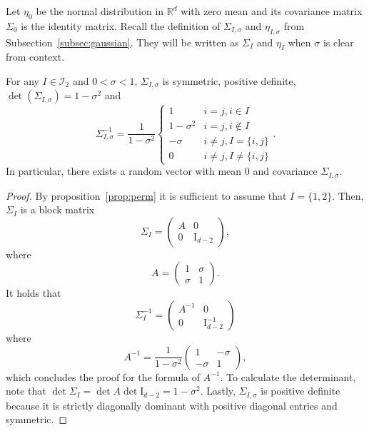 \documentclass[final, 12pt]{colt2018}
\newcommand{\subsecref}[1]{Subsection~\ref{#1}}
\begin{document}
Let $\eta_0$ be the normal distribution in $\mathbb{R}^d$ with zero mean and its covariance matrix $\Sigma_0$ is the identity matrix. Recall the definition of $\Sigma_{I,\sigma}$ and $\eta_{I,\sigma}$ from \subsecref{subsec:gaussian}. They will be written as $\Sigma_I$ and $\eta_I$  when $\sigma$ is clear from context.

\begin{lemma} \label{lem:sigma-I}
For any $I \in \mathcal{I}_2$ and $0 < \sigma < 1$, $\Sigma_{I,\sigma}$ is symmetric, positive definite, $\det(\Sigma_{I,\sigma}) = 1 - \sigma^2$ and 
\begin{equation} \label{eq:def-sig-inv}
\Sigma_{I,\sigma}^{-1}
= \frac{1}{1-\sigma^2} \begin{cases}
1 & i=j, i \in I \\
1 - \sigma^2 & i = j, i \notin I \\
-\sigma & i \ne j, I = \{i,j\} \\
0 & i \ne j, I \ne \{i,j\}
\end{cases}.
\end{equation}
In particular, there exists a random vector with mean $0$ and covariance $\Sigma_{I,\sigma}$.
\end{lemma}
\begin{proof}
By proposition~\ref{prop:perm} it is sufficient to assume that $I = \{1,2\}$. Then, $\Sigma_I$ is a block matrix
\[
\Sigma_I = \begin{pmatrix}
A & 0\\
0 & \mathrm{I}_{d-2}
\end{pmatrix},
\]
where
\[
A=\begin{pmatrix}
1 & \sigma \\
\sigma & 1
\end{pmatrix}.
\]
It holds that
\[
\Sigma_I^{-1} = \begin{pmatrix}
A^{-1} & 0 \\
0 & \mathrm{I}_{d-2}^{-1}
\end{pmatrix}
\]
where
\[
A^{-1} = \frac{1}{1-\sigma^2} \begin{pmatrix}
1 & -\sigma \\
-\sigma & 1
\end{pmatrix},
\]
which concludes the proof for the formula of $A^{-1}$.
To calculate the determinant, note that $\det \Sigma_I = \det A \det \mathrm{I}_{d-2} = 1 - \sigma^2$.
Lastly, $\Sigma_{I,\sigma}$ is positive definite because it is strictly diagonally dominant with positive diagonal entries and symmetric.
\end{proof}
\end{document}

